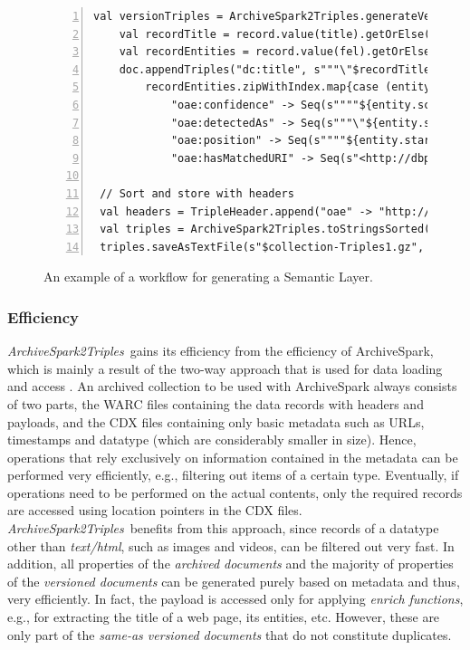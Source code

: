 \documentclass[twocolumn]{svjour3}
\newcommand{\tool}[0]{{\em ArchiveSpark2Triples}}
\begin{document}
\begin{figure}[th]
\begin{Verbatim}[frame=lines,numbers=left,numbersep=1pt]
 val versionTriples = ArchiveSpark2Triples.generateVersionsMapped(responsesWithEntities) {(record, uid, doc) =>
    val recordTitle = record.value(title).getOrElse("")
    val recordEntities = record.value(fel).getOrElse(Seq.empty)
    doc.appendTriples("dc:title", s"""\"$recordTitle\"""").appendChildren("schema:mentions", {
        recordEntities.zipWithIndex.map{case (entity, i) => TripleDoc(s"_:e$uid-$i", "oae:Entity", Seq(
            "oae:confidence" -> Seq(s""""${entity.score}"^^xsd:double"""),
            "oae:detectedAs" -> Seq(s"""\"${entity.span}\""""),
            "oae:position" -> Seq(s""""${entity.startOffset}"^^xsd:integer"""),
            "oae:hasMatchedURI" -> Seq(s"<http://dbpedia.org/resource/${entity.annotation}>")))}})}

 // Sort and store with headers
 val headers = TripleHeader.append("oae" -> "http://www.ics.forth.gr/isl/oae/core#")
 val triples = ArchiveSpark2Triples.toStringsSorted(headers, documentTriples, sameAsTriples, versionTriples)
 triples.saveAsTextFile(s"$collection-Triples1.gz", classOf[GzipCodec])
\end{Verbatim}
\vspace{-3.5mm}
\caption{An example of a workflow for generating a Semantic Layer.}
\label{fig:workflowExample}
\vspace{-2mm}
\end{figure}

\subsubsection*{Efficiency}
\tool\ gains its efficiency from the efficiency of ArchiveSpark,
which is mainly a result of the two-way approach
that is used for data loading and access \cite{holzmann2016archivespark}.
An archived collection to be used with ArchiveSpark always consists of two parts,
the WARC files containing the data records with headers and payloads,
and the CDX files containing only basic metadata
such as URLs, timestamps and datatype (which are considerably smaller in size).
Hence, operations that rely exclusively on information contained in the metadata
can be performed very efficiently,
e.g., filtering out items of a certain type.
Eventually, if operations need to be performed on the actual contents,
only the required records are accessed using location pointers in the CDX files.
\tool\ benefits from this approach,
since records of a datatype other than {\em text/html},
such as images and videos, can be filtered out very fast.
In addition,
all properties of the {\em archived documents} and the majority of properties
of the {\em versioned documents} can be generated purely based on metadata and thus,
very efficiently.
In fact, the payload is accessed only for applying {\em enrich functions},
e.g., for extracting the title of a web page, its entities, etc.
However, these are only part of the {\em same-as versioned documents}
that do not constitute duplicates.
\end{document}
